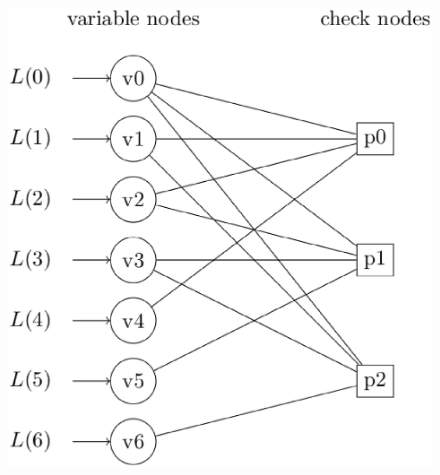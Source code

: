 \documentclass[journal,12pt,twocolumn]{IEEEtran}
\begin{document}
\begin{figure}[!ht]
\begin{center}
%
%
%    
%
%
%
%
%
%
\includegraphics[width=\columnwidth]{./figs/tanner}

\end{center}
\end{figure}
\end{document}
